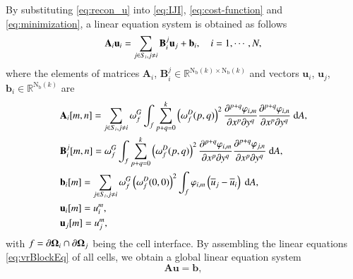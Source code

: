 {By substituting \eqref{eq:recon_u} into \eqref{eq:IJI}, \eqref{eq:cost-function} and \eqref{eq:minimization}, a linear equation system is obtained as follows
\begin{equation}
    \label{eq:vrBlockEq}
    \mathbf{A}_{i} \mathbf{u}_i
    =
    \sum_{j \in S_i, j \neq i} \mathbf{B}^j_{i} \mathbf{u}_j + \mathbf{b}_{i}, \quad i=1, \cdots, N,
\end{equation}
where the elements of matrices
$\mathbf{A}_i$, $\mathbf{B}^j_i \in \mathbb{R}^{\mathrm{N_b}(k) \times \mathrm{N_b}(k)}$
and vectors $\mathbf{u}_i$, $\mathbf{u}_j$, $\mathbf{b}_i \in \mathbb{R}^{\mathrm{N_b}(k)}$ are
\begin{equation}
    \label{eq:vrCoeffs}
    \begin{aligned}
         & \mathbf{A}_{i} [m,n]=
        \sum_{j \in S_i, j \neq i} \omega_f^G\int_{f}{
            \sum_{p+q=0}^{k}
            \left(\omega_f^D(p,q)\right)^2
            \partialderivative{^{p+q}\varphi_{i,m}}{x^p\partial y^q}
            \partialderivative{^{p+q}\varphi_{i,n}}{x^p\partial y^q}
            \ \dd A},
        \\
         & \mathbf{B}^j_{i} [m,n]=
        \omega_f^G\int_{f}{
            \sum_{p+q=0}^{k}
            \left(\omega_f^D(p,q)\right)^2
            \partialderivative{^{p+q}\varphi_{i,m}}{x^p\partial y^q}
            \partialderivative{^{p+q}\varphi_{j,n}}{x^p\partial y^q}
            \ \dd A},
        \\
         & \mathbf{b}_{i} [m]=
        \sum_{j \in S_i, j \neq i}
        \omega_f^G \left(\omega_f^D(0,0)\right)^2
        \int_{f}{
            \varphi_{i,m} \left(\overline{u}_j - \overline{u}_i\right)
            \ \dd A},
        \\
         & \mathbf{u}_i [m]= u^m_i, \\
         & \mathbf{u}_j [m]= u^m_j,
    \end{aligned}
\end{equation}
with $f= \partial \mathbf{\Omega}_i \cap \partial \mathbf{\Omega}_j$ being the cell interface.}
By assembling the linear equations \eqref{eq:vrBlockEq} of all cells, we obtain a global linear equation system
\begin{equation}
    \label{eq:global-system}
    \mathbf{A} \mathbf{u} = \mathbf{b},
\end{equation}
